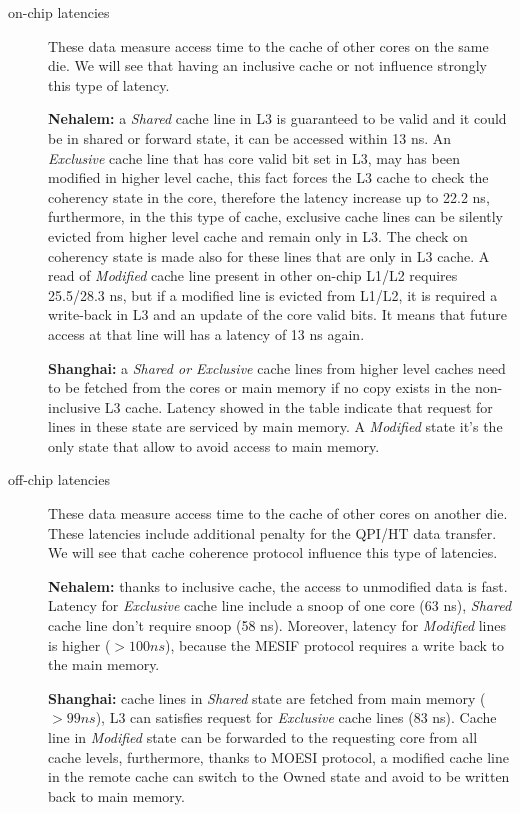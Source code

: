 \begin{description} %

\item[on-chip latencies] These data measure access time to the cache of other cores on the same die. We will see that having an inclusive cache or not
influence strongly this type of latency. 

\textbf{Nehalem:} a \textit{Shared} cache line in L3 is guaranteed to be valid and it could be in shared or forward state, it can be accessed within 13 ns. 
An \textit{Exclusive} cache line that has core valid bit set in L3, may has been modified in higher level cache, this fact forces the L3 cache to check the 
coherency state in the core, therefore the latency increase up to 22.2 ns, furthermore, in the this type of cache, exclusive cache lines can be silently 
evicted from higher level cache and remain only in L3. The check on coherency state is made also for these lines that are only in L3 cache.
A read of \textit{Modified} cache line present in other on-chip L1/L2 requires 25.5/28.3 ns, but if a modified line is evicted from L1/L2, it is required a 
write-back in L3 and an update of the core valid bits. It means that future access at that line will has a latency of 13 ns again.

\textbf{Shanghai:} a \textit{Shared or Exclusive} cache lines from higher level caches need to be fetched from the cores or main memory if no copy exists 
in the non-inclusive L3 cache. Latency showed in the table indicate that request for lines in these state are serviced by main memory.
A \textit{Modified} state it's the only state that allow to avoid access to main memory.

\item[off-chip latencies] These data measure access time to the cache of other cores on another die. These latencies include additional penalty for the
QPI/HT data transfer. We will see that cache coherence protocol influence this type of latencies.

\textbf{Nehalem:} thanks to inclusive cache, the access to unmodified data is fast. Latency for \textit{Exclusive} cache line include a snoop of one core 
(63 ns), \textit{Shared} cache line don't require snoop (58 ns). Moreover, latency for \textit{Modified} lines is higher ($> 100 ns$), because the MESIF 
protocol requires a write back to the main memory.

\textbf{Shanghai:} cache lines in \textit{Shared} state are fetched from main memory ($> 99 ns$), L3 can satisfies request for \textit{Exclusive} cache lines 
(83 ns). Cache line in \textit{Modified} state can be forwarded to the requesting core from all cache levels, furthermore, thanks to MOESI protocol, a 
modified cache line in the remote cache can switch to the Owned state and avoid to be written back to main memory.

\end{description} %

